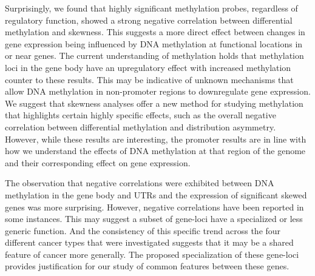 \documentclass[11pt]{article}
\begin{document}
Surprisingly, we found that highly significant methylation probes, regardless of regulatory function, showed a strong negative correlation between differential methylation and skewness. This suggests a more direct effect between changes in gene expression being influenced by DNA methylation at functional locations in or near genes. The current understanding of methylation holds that methylation loci in the gene body have an upregulatory effect with increased methylation counter to these results. This may be indicative of unknown mechanisms that allow DNA methylation in non-promoter regions to downregulate gene expression. We suggest that skewness analyses offer a new method for studying methylation that highlights certain highly specific effects, such as the overall negative correlation between differential methylation and distribution asymmetry. However, while these results are interesting, the promoter results are in line with how we understand the effects of DNA methylation at that region of the genome and their corresponding effect on gene expression. 
\newline

The observation that negative correlations were exhibited between DNA methylation in the gene body and UTRs and the expression of significant skewed genes was more surprising. However, negative correlations have been reported in some instances. This may suggest a subset of gene-loci have a specialized or less generic function. And the consistency of this specific trend across the four different cancer types that were investigated suggests that it may be a shared feature of cancer more generally. The proposed specialization of these gene-loci provides justification for our study of common features between these genes.
\end{document}
